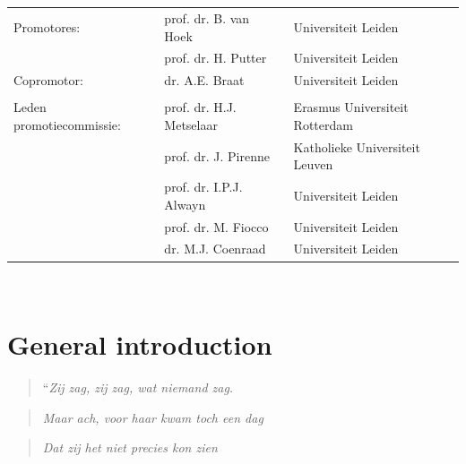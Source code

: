\documentclass[11pt,english,]{book} %
\begin{document}
\clearpage
\thispagestyle{empty}
\noindent\textbf{}\\
\\
\noindent\begin{tabular}{@{}lll}

Promotores:
&  prof. dr. B. van Hoek & Universiteit Leiden\\
&  prof. dr. H. Putter & Universiteit Leiden\\

Copromotor:
&  dr. A.E. Braat & Universiteit Leiden\\

\\
Leden promotiecommissie:
&  prof. dr. H.J. Metselaar & Erasmus Universiteit Rotterdam\\
&  prof. dr. J. Pirenne & Katholieke Universiteit Leuven\\
&  prof. dr. I.P.J. Alwayn & Universiteit Leiden\\
&  prof. dr. M. Fiocco & Universiteit Leiden\\
&  dr. M.J. Coenraad & Universiteit Leiden\\
\end{tabular}\\




{
\linespread{1.1}
\tableofcontents
}
\linespread{1.213}
\mainmatter
{}

\newpage
\thispagestyle{plain}

\mbox{}
\pagecolor{black}
\color{white}

\hypertarget{general-introduction}{%
\chapter{General introduction}\label{general-introduction}}

\begin{quote}
``\emph{Zij zag, zij zag, wat niemand zag.}
\end{quote}

\begin{quote}
\emph{Maar ach, voor haar kwam toch een dag}
\end{quote}

\begin{quote}
\emph{Dat zij het niet precies kon zien}
\end{quote}
\end{document}
